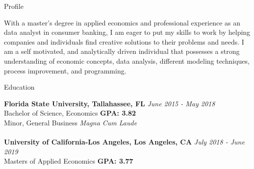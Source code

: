 \documentclass{resume} %
\begin{document}
\vspace{-1.3em}
\begin{rSection}{Profile}

With a master’s degree in applied economics and professional experience as an data analyst in consumer banking, I am eager to put my skills to work by helping companies and individuals find creative solutions to their problems and needs. I am a self motivated, and analytically driven individual that possesses a strong understanding of economic concepts, data analysis, different modeling techniques, process improvement, and programming. 

\end{rSection}

\begin{rSection}{Education}

{\bf Florida State University, Tallahassee, FL} \hfill {\em June 2015 - May 2018} 
\\ Bachelor of Science, Economics \hfill { \bf GPA: 3.82}
\\ Minor, General Business \hfill {\em Magna Cum Laude}
\\ 
\\{\bf University of California-Los Angeles, Los Angeles, CA} \hfill {\em July 2018 - June 2019} 
\\ Masters of Applied Economics\hfill { \bf GPA: 3.77 }

\end{rSection}
\end{document}
